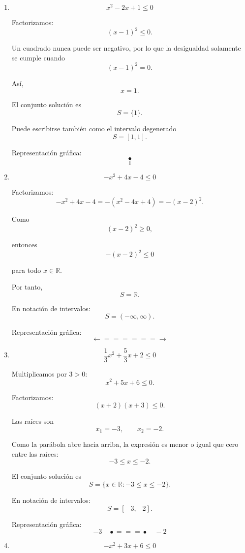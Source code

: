 \documentclass[12pt]{article}
\theoremstyle{plain}
\theoremstyle{definition}
\theoremstyle{remark}
\begin{document}
{\begin{enumerate}
\item
\[
x^2-2x+1\leq0
\]

Factorizamos:
\[
(x-1)^2\leq0.
\]

Un cuadrado nunca puede ser negativo, por lo que la desigualdad solamente
se cumple cuando
\[
(x-1)^2=0.
\]

Así,
\[
x=1.
\]

El conjunto solución es
\[
\boxed{
S=\{1\}.
}
\]

Puede escribirse también como el intervalo degenerado
\[
\boxed{
S=[1,1].
}
\]

Representación gráfica:
\[
\bullet
\]
\[
1
\]

\item
\[
-x^2+4x-4\leq0
\]

Factorizamos:
\[
-x^2+4x-4
=
-(x^2-4x+4)
=
-(x-2)^2.
\]

Como
\[
(x-2)^2\geq0,
\]

entonces
\[
-(x-2)^2\leq0
\]

para todo \(x\in\mathbb{R}\).

Por tanto,
\[
\boxed{
S=\mathbb{R}.
}
\]

En notación de intervalos:
\[
\boxed{
S=(-\infty,\infty).
}
\]

Representación gráfica:
\[
\longleftarrow\!\!=\!\!=\!\!=\!\!=\!\!=\!\!=\!\longrightarrow
\]

\item
\[
\frac{1}{3}x^2+\frac{5}{3}x+2\leq0
\]

Multiplicamos por \(3>0\):
\[
x^2+5x+6\leq0.
\]

Factorizamos:
\[
(x+2)(x+3)\leq0.
\]

Las raíces son
\[
x_1=-3,
\qquad
x_2=-2.
\]

Como la parábola abre hacia arriba, la expresión es menor o igual que
cero entre las raíces:
\[
-3\leq x\leq-2.
\]

El conjunto solución es
\[
\boxed{
S=
\{x\in\mathbb{R}:-3\leq x\leq-2\}.
}
\]

En notación de intervalos:
\[
\boxed{
S=[-3,-2].
}
\]

Representación gráfica:
\[
-3\quad
\bullet\!\!=\!\!=\!\!=\!\bullet
\quad-2
\]

\item
\[
-x^2+3x+6\leq0
\]


\end{enumerate}}
\end{document}
